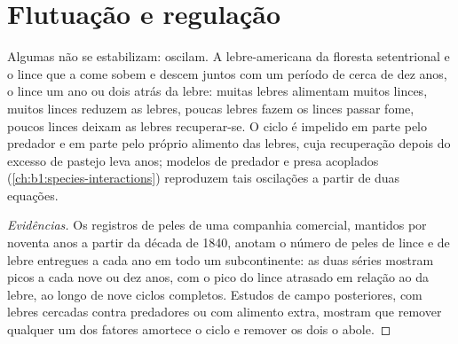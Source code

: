 \section{Flutuação e regulação}

\begin{proposition}\label{prop:b1:populations:cycles}
Algumas  não se estabilizam: oscilam. A lebre-americana da
floresta setentrional e o lince que a come sobem e descem juntos com
um período de cerca de dez anos, o lince um ano ou dois atrás da
lebre: muitas lebres alimentam muitos linces, muitos linces reduzem as
lebres, poucas lebres fazem os linces passar fome, poucos linces
deixam as lebres recuperar-se. O ciclo é impelido em parte pelo
predador e em parte pelo próprio alimento das lebres, cuja recuperação
depois do excesso de pastejo leva anos; modelos de predador e presa
acoplados (\cref{ch:b1:species-interactions}) reproduzem tais
oscilações a partir de duas equações.
\end{proposition}
\begin{proof}[Evidências]
Os registros de peles de uma companhia comercial, mantidos por noventa
anos a partir da década de 1840, anotam o número de peles de lince e
de lebre entregues a cada ano em todo um subcontinente: as duas séries
mostram picos a cada nove ou dez anos, com o pico do lince atrasado em
relação ao da lebre, ao longo de nove ciclos completos. Estudos de
campo posteriores, com lebres cercadas contra predadores ou com
alimento extra, mostram que remover qualquer um dos fatores amortece o
ciclo e remover os dois o abole.
\end{proof}

